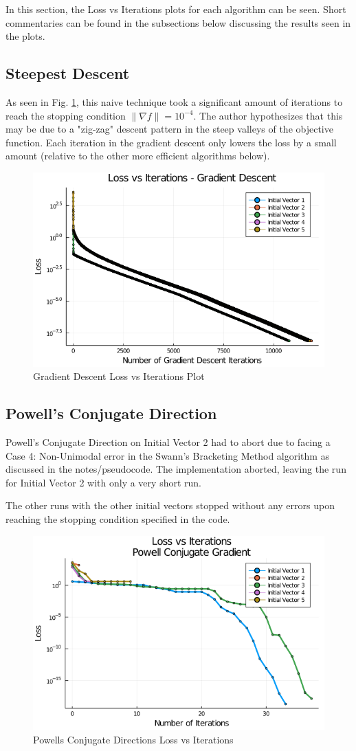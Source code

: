 \documentclass{article}
\begin{document}
    In this section, the Loss vs Iterations plots for each algorithm can be seen.
    Short commentaries can be found in the subsections below discussing the results seen in the plots.
    \subsection{Steepest Descent}

    As seen in Fig. \ref{fig:GradientDescentLossPlot.png}, 
    this naive technique took a significant amount of iterations to reach the stopping condition $\| \nabla f \| = 10^{-4}$.
    The author hypothesizes that this may be due to a "zig-zag" descent pattern in the steep valleys of the objective function.
    Each iteration in the gradient descent only lowers the loss by a small amount (relative to the other more efficient algorithms below).

    \begin{figure}[H]
        \centering
        \includegraphics[width=0.5\linewidth]{GradientDescentLossPlot.png}
        \caption{Gradient Descent Loss vs Iterations Plot}
        \label{fig:GradientDescentLossPlot.png}
    \end{figure}

    \subsection{Powell's Conjugate Direction}

    Powell's Conjugate Direction on Initial Vector 2 had to abort due to facing a Case 4: Non-Unimodal error in the Swann's Bracketing Method algorithm as discussed in the notes/pseudocode. The implementation aborted, leaving the run for Initial Vector 2 with only a very short run.

    The other runs with the other initial vectors stopped without any errors upon reaching the stopping condition specified in the code.

    \begin{figure}[H]
        \centering
        \includegraphics[width=0.5\linewidth]{PowellConjugateGradient_LossPlot.png}
        \caption{Powells Conjugate Directions Loss vs Iterations}
        \label{fig:PowellConjugateGradient_LossPlot.png}
    \end{figure}
\end{document}
